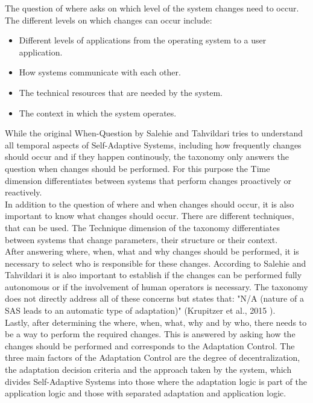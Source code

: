 The question of where asks on which level of the system changes need to occur.
The different levels on which changes can occur include:
\begin{itemize}
    \item Different levels of applications from the operating system to a user application.
    \item How systems communicate with each other.
    \item The technical resources that are needed by the system.
    \item The context in which the system operates.
\end{itemize}

While the original When-Question by Salehie and Tahvildari tries to understand all temporal aspects of Self-Adaptive Systems,
including how frequently changes should occur and if they happen continously,
the taxonomy only answers the question when changes should be performed.
For this purpose the Time dimension differentiates between systems that perform changes proactively or reactively. \\

In addition to the question of where and when changes should occur, it is also important to know
what changes should occur. There are different techniques, that can be used.
The Technique dimension of the taxonomy differentiates between systems that change parameters, their structure or their context. \\

After answering where, when, what and why changes should be performed, 
it is necessary to select who is responsible for these changes.
According to Salehie and Tahvildari it is also important to establish if the changes can be performed fully autonomous
or if the involvement of human operators is necessary.
The taxonomy does not directly address all of these concerns but states that:
"N/A (nature of a SAS leads to an automatic type of adaptation)" (Krupitzer et al., 2015 \cite{SurveyOnEngineeringApproaches}). \\

Lastly, after determining the where, when, what, why and by who, there needs to be a way
to perform the required changes. This is answered by asking how the changes should be performed
and corresponds to the Adaptation Control.
The three main factors of the Adaptation Control are the degree of decentralization, the adaptation decision criteria
and the approach taken by the system, which divides Self-Adaptive Systems into those where the adaptation logic is part of the application logic
and those with separated adaptation and application logic.

